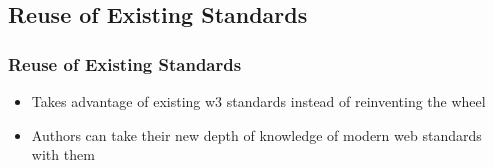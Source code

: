 \documentclass{beamer}
\begin{document}
\subsection{Reuse of Existing Standards}

\begin{frame}
\frametitle{Reuse of Existing Standards}
\begin{itemize}
\item Takes advantage of existing w3 standards instead of reinventing the wheel
\item Authors can take their new depth of knowledge of modern web standards with them
\end{itemize}
\end{frame}
\end{document}

